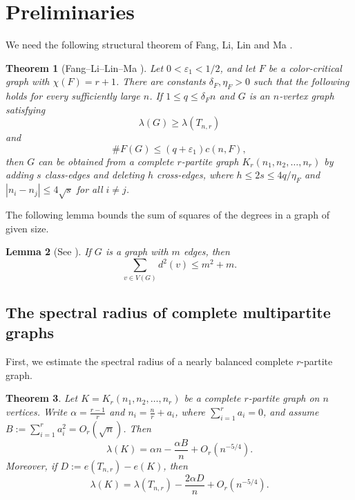 \documentclass[11pt,a4paper]{article}
\newtheorem{theorem}{Theorem}[section]
\newtheorem{lemma}[theorem]{Lemma}
\theoremstyle{definition}
\theoremstyle{plain}
\renewcommand{\le}{\leqslant}
\renewcommand{\ge}{\geqslant}
\begin{document}
\section{Preliminaries} 

\label{sec:prelim}

We need the following structural theorem of 
Fang, Li, Lin and Ma \cite{FLLM2025}.

\begin{theorem}[Fang--Li--Lin--Ma \cite{FLLM2025}]
\label{thm:FLLM}
Let $0<\varepsilon_1<1/2$, and let $F$ be a color-critical graph  with $\chi(F)=r+1$. There are constants
$\delta_F,\eta_F>0$ such that the following holds for every sufficiently large $n$.
If $  1\le q\le \delta_F n$ 
and $G$ is an $n$-vertex graph satisfying
\[
        \lambda(G)\ge \lambda(T_{n,r})
\]
and
\[
        \texttt{\#} F(G)\le (q+\varepsilon_1)c(n,F),
\]
then $G$ can be obtained from a complete $r$-partite graph $  K_r(n_1,n_2,\ldots,n_r)$ 
by adding $s$ class-edges and deleting $h$ cross-edges, where $  h\le 2s\le {4q}/{\eta_F} $ and 
$|n_i-n_j|\le 4\sqrt{s}$ for all $i\neq j$.  
\end{theorem}





The following lemma bounds 
 the sum of squares of the degrees in a graph of given size.  
  
 \begin{lemma}[See \cite{NZ2021b}] \label{lem-deg-squ}
If $G$ is a graph with $m$ edges, then  
\[  \sum_{v\in V(G)}d^2(v) \le m^2 +m. \]  
 \end{lemma} 


\subsection{The spectral radius of complete multipartite graphs}

First, we estimate the spectral radius of a nearly balanced complete
$r$-partite graph. 



\begin{theorem} 
\label{thm:multipartite-expansion}
Let $  K=K_r(n_1,n_2,\ldots,n_r)$ 
be a complete $r$-partite graph on $n$ vertices. 
Write $\alpha= \frac{r-1}{r}$ and $  n_i=\frac nr+a_i$, where $\sum_{i=1}^r a_i=0$, and assume $ B:=\sum_{i=1}^r a_i^2=O_r(\sqrt n)$. 
Then
\begin{equation}
        \lambda(K)
    =\alpha n-\frac{\alpha B}{n}+O_r(n^{-5/4}). 
        \label{eq:multipartite-expansion}
\end{equation}
Moreover, if $ D:=e(T_{n,r})-e(K)$, 
then
\begin{equation*}
        \lambda(K)
        =\lambda(T_{n,r})-\frac{2\alpha D}{n}+O_r(n^{-5/4}). 
\end{equation*}
\end{theorem}
\end{document}
